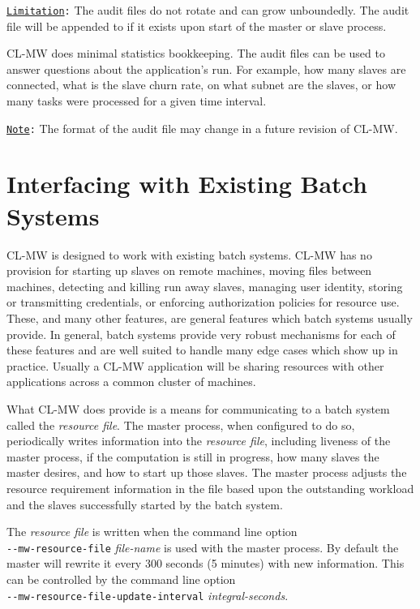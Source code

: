 \documentclass[titlepage,12pt]{book}
\newcommand{\xsmall}{\latexhtml{\small}{}}
\newcommand{\xnormalsize}{\latexhtml{\normalsize}{}}
\newcommand{\clmw}{\xsmall\textsc{CL-MW}\xnormalsize\xspace}
\newcommand{\rfile}{\textit{resource file}\xspace}
\newcommand{\dash}{\texttt{-}}
\newcommand{\OptionV}[2]{\dash\dash\texttt{#1} \textit{#2}}
\newcommand{\Note}{\texttt{\underline{Note}:}\xspace}
\newcommand{\Limitation}{\texttt{\underline{Limitation}:}\xspace}
\begin{document}
\Limitation The audit files do not rotate and can grow unboundedly. The
audit file will be appended to if it exists upon start of the master
or slave process.

\clmw does minimal statistics bookkeeping. The audit files can be used
to answer questions about the application's run. For example, how many
slaves are connected, what is the slave churn rate, on what subnet are
the slaves, or how many tasks were processed for a given time interval.

\Note The format of the audit file may change in a future revision of \clmw.

\chapter{Interfacing with Existing Batch Systems}

\clmw is designed to work with existing batch systems.  \clmw has no
provision for starting up slaves on remote machines, moving files
between machines, detecting and killing run away slaves, managing
user identity, storing or transmitting credentials, or enforcing
authorization policies for resource use.  These, and many other
features, are general features which batch systems usually provide.
In general, batch systems provide very robust mechanisms for each of
these features and are well suited to handle many edge cases which
show up in practice. Usually a \clmw application will be sharing
resources with other applications across a common cluster of machines.

What \clmw does provide is a means for communicating to a batch system
called the \rfile.  The master process, when configured to do so,
periodically writes information into the \rfile, including liveness
of the master process, if the computation is still in progress, how
many slaves the master desires, and how to start up those slaves.
The master process adjusts the resource requirement information in the
file based upon the outstanding workload and the slaves successfully
started by the batch system.

The \rfile is written when the command line option\\
\OptionV{mw-resource-file}{file-name} is used with the
master process. By default the master will rewrite it
every 300 seconds (5 minutes) with new information. This
can be controlled by the command line option\\
\OptionV{mw-resource-file-update-interval}{integral-seconds}.
\end{document}
